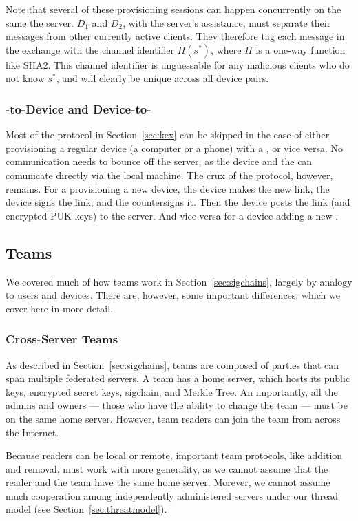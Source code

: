 Note that several of these provisioning sessions can happen concurrently on the
same the server. $D_1$ and $D_2$, with the server's assistance, must separate
their messages from other currently active clients.  They therefore tag each
message in the exchange with the channel identifier $H(s^{*})$, where $H$ is a
one-way function like SHA2. This channel identifier is unguessable for 
any malicious clients who do not know $s^{*}$, and will clearly be unique
across all device pairs.

\subsubsection{\Yubi -to-Device and Device-to-\Yubi }

Most of the protocol in Section~\ref{sec:kex} can be skipped in the case
of either provisioning a regular device (a computer or a phone) with a \yubi ,
or vice versa. No communication needs to bounce off the server, as the device
and the \yubi{} can comunicate directly via the local machine. The crux of 
the protocol, however, remains. For a \yubi{} provisioning a new device,
the device makes the new link, the device signs the link, and the \yubi{} 
countersigns it. Then the device posts the link (and encrypted PUK keys)
to the server. And vice-versa for a device adding a new \yubi . 

\subsection{Teams}
\label{sec:teams}

We covered much of how teams work in Section~\ref{sec:sigchains}, largely by
analogy to users and devices. There are, however, some important differences,
which we cover here in more detail.

\subsubsection{Cross-Server Teams}

As described in Section~\ref{sec:sigchains}, teams are composed of parties
that can span multiple federated servers. A team has a home server, which 
hosts its public keys, encrypted secret keys, sigchain, and Merkle Tree.
An importantly, all the admins and owners --- those who have the ability
to change the team --- must be on the same home server. However, team readers
can join the team from across the Internet.

Because readers can be local or remote, important team protocols, like addition
and removal, must work with more generality, as we cannot assume that the reader
and the team have the same home server. Morever, we cannot assume much
cooperation among independently administered servers under our thread model
(see Section~\ref{sec:threatmodel}).

